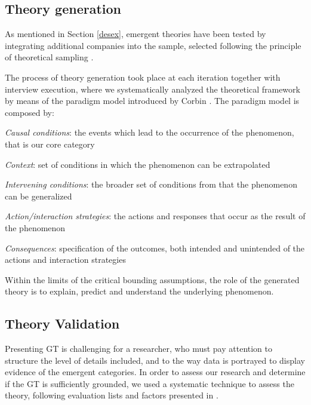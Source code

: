 \documentclass[10pt,journal,letterpaper,compsoc]{IEEEtran}
\begin{document}
\subsection{Theory generation}

As mentioned in Section \ref{desex}, emergent theories have been tested by 
integrating additional companies into the sample, selected following the 
principle of theoretical sampling \cite{Yin1994}. 

The process of theory generation took place at each iteration together with 
interview execution, where we systematically analyzed the theoretical framework 
by means of the paradigm model introduced by Corbin \cite{Corbin1990}. The 
paradigm model is composed by: 

\begin{compactitem}
\item \textit{Causal conditions}: the events which lead to the occurrence of 
the phenomenon, that is our core category
\item \textit{Context}: set of conditions in which the phenomenon can be 
extrapolated
\item \textit{Intervening conditions}: the broader set of conditions from that 
the phenomenon can be generalized
\item \textit{Action/interaction strategies}: the actions and responses that 
occur as the result of the phenomenon
\item \textit{Consequences}: specification of the outcomes, both intended and 
unintended of the actions and interaction strategies
\end{compactitem}

Within the limits of the critical bounding assumptions, the role of the 
generated theory is to explain, predict and understand the underlying 
phenomenon.

\subsection{Theory Validation}
\label{rm:val}

Presenting GT is challenging for a researcher, who must pay attention to structure the level of details included, and to the way data is portrayed to display evidence of the emergent categories.  In order to assess our research and determine if the GT is sufficiently grounded, we used a systematic technique to assess the theory, following evaluation lists and factors presented in  \cite{Strauss1998}.
\end{document}

